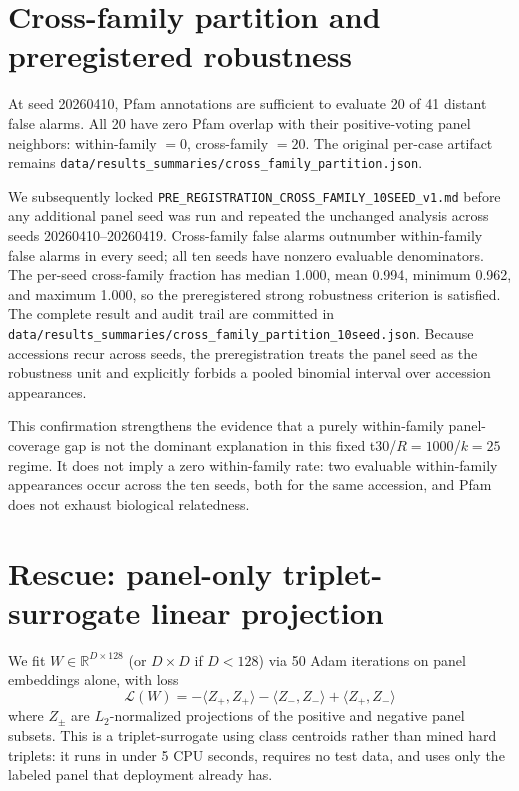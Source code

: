\documentclass[11pt]{article}
\begin{document}
\section{Cross-family partition and preregistered robustness}
At seed 20260410, Pfam annotations are sufficient to evaluate 20 of 41 distant false alarms. All 20 have zero Pfam overlap with their positive-voting panel neighbors: within-family $=0$, cross-family $=20$. The original per-case artifact remains \texttt{data/results\_summaries/cross\_family\_partition.json}.

We subsequently locked \texttt{PRE\_REGISTRATION\_CROSS\_FAMILY\_10SEED\_v1.md} before any additional panel seed was run and repeated the unchanged analysis across seeds 20260410--20260419. Cross-family false alarms outnumber within-family false alarms in every seed; all ten seeds have nonzero evaluable denominators. The per-seed cross-family fraction has median 1.000, mean 0.994, minimum 0.962, and maximum 1.000, so the preregistered strong robustness criterion is satisfied. The complete result and audit trail are committed in \texttt{data/results\_summaries/cross\_family\_partition\_10seed.json}. Because accessions recur across seeds, the preregistration treats the panel seed as the robustness unit and explicitly forbids a pooled binomial interval over accession appearances.

This confirmation strengthens the evidence that a purely within-family panel-coverage gap is not the dominant explanation in this fixed t30/$R{=}1000$/$k{=}25$ regime. It does not imply a zero within-family rate: two evaluable within-family appearances occur across the ten seeds, both for the same accession, and Pfam does not exhaust biological relatedness.

\section{Rescue: panel-only triplet-surrogate linear projection}
We fit $W \in \mathbb{R}^{D \times 128}$ (or $D \times D$ if $D < 128$) via 50 Adam iterations on panel embeddings alone, with loss
\[
\mathcal{L}(W) = -\langle Z_+, Z_+ \rangle - \langle Z_-, Z_- \rangle + \langle Z_+, Z_- \rangle
\]
where $Z_\pm$ are $L_2$-normalized projections of the positive and negative panel subsets. This is a triplet-surrogate \cite{schroff2015facenet} using class centroids rather than mined hard triplets: it runs in under 5 CPU seconds, requires no test data, and uses only the labeled panel that deployment already has.
\end{document}
